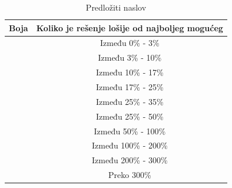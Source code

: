\documentclass[a4paper]{article}
\begin{document}
\begin{table}[]
\centering
\caption{Predložiti naslov}
\label{tab:tab1}
\begin{tabular}{|c|l|c|l|l|}
\hline
\multicolumn{2}{|c|}{Boja}                     & \multicolumn{3}{l|}{Koliko je rešenje lošije od najboljeg mogućeg} \\ \hline
\multicolumn{2}{|c|}{\cellcolor[HTML]{FFFFFF}} & \multicolumn{3}{c|}{Između 0\% - 3\%}                              \\ \hline
\multicolumn{2}{|c|}{\cellcolor[HTML]{FFFF8F}} & \multicolumn{3}{c|}{Između 3\% - 10\%}                             \\ \hline
\multicolumn{2}{|c|}{\cellcolor[HTML]{FEFF1F}} & \multicolumn{3}{c|}{Između 10\% - 17\%}                            \\ \hline
\multicolumn{2}{|c|}{\cellcolor[HTML]{FFCA00}} & \multicolumn{3}{c|}{Između 17\% - 25\%}                            \\ \hline
\multicolumn{2}{|c|}{\cellcolor[HTML]{FF7F00}} & \multicolumn{3}{c|}{Između 25\% - 35\%}                            \\ \hline
\multicolumn{2}{|c|}{\cellcolor[HTML]{FE3500}} & \multicolumn{3}{c|}{Između 25\% - 50\%}                            \\ \hline
\multicolumn{2}{|c|}{\cellcolor[HTML]{EA0001}} & \multicolumn{3}{c|}{Između 50\% - 100\%}                           \\ \hline
\multicolumn{2}{|c|}{\cellcolor[HTML]{9F0100}} & \multicolumn{3}{c|}{Između 100\% - 200\%}                          \\ \hline
\multicolumn{2}{|c|}{\cellcolor[HTML]{540000}} & \multicolumn{3}{c|}{Između 200\% - 300\%}                          \\ \hline
\multicolumn{2}{|c|}{\cellcolor[HTML]{0A0000}} & \multicolumn{3}{c|}{Preko 300\%}                                   \\ \hline
\end{tabular}
\end{table}

\newpage
\end{document}
